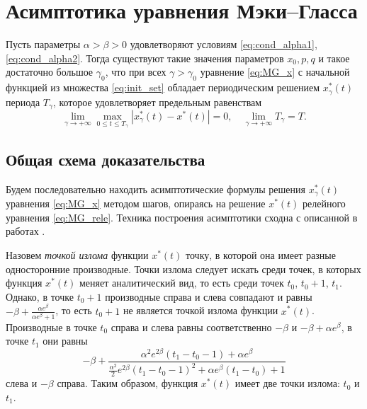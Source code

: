 \section{Асимптотика уравнения Мэки--Гласса}


\begin{theorem}
    \label{thm:existence}
Пусть параметры $\alpha > \beta > 0$ удовлетворяют условиям \eqref{eq:cond_alpha1}, \eqref{eq:cond_alpha2}. Тогда существуют такие значения параметров $x_0, p, q$ и такое достаточно большое $\gamma_0$, что при всех $\gamma > \gamma_0$ уравнение \eqref{eq:MG_x} с начальной функцией из множества \eqref{eq:init_set} обладает периодическим решением $x^*_\gamma(t)$ периода $T_\gamma$, которое удовлетворяет предельным равенствам 
\begin{equation}
\label{eq:lim_x*}
	\lim_{\gamma\to+\infty}\max_{0\leqslant t\leqslant T_\gamma}|x_{\gamma}^*(t)-x^*(t)|=0,\quad \lim_{\gamma\to+\infty}T_{\gamma} = T.
\end{equation}
\end{theorem}

\subsection{Общая схема доказательства}
Будем последовательно находить асимптотические формулы решения $x_{\gamma}^*(t)$ уравнения \eqref{eq:MG_x} методом шагов, опираясь на решение $x^*(t)$ релейного уравнения \eqref{eq:MG_rele}. Техника построения асимптотики сходна с описанной в работах \cite{Kolesov2010, Glyzin2013}.

Назовем \textit{точкой излома} функции $x^*(t)$ точку, в которой она имеет разные односторонние производные. Точки излома следует искать среди точек, в которых функция $x^*(t)$ меняет аналитический вид, то есть среди точек $t_0$, $t_0+1$, $t_1$. Однако, в точке $t_0+1$ производные справа и слева совпадают и равны $-\beta+\frac{\alpha e^{\beta}}{\alpha e^{\beta}+1}$, то есть $t_0+1$ не является точкой излома функции $x^*(t)$. Производные в точке $t_0$ справа и слева равны соответственно $-\beta$ и $-\beta+\alpha e^\beta$, в точке $t_1$ они равны $$-\beta+\frac{\alpha^2e^{2\beta}(t_1-t_0-1)+\alpha e^\beta}{\frac{\alpha^2}{2}e^{2\beta}(t_1-t_0-1)^2+\alpha e^{\beta}(t_1-t_0)+1}$$ слева и $-\beta$ справа. 
Таким образом, функция $x^*(t)$ имеет две точки излома: $t_0$ и $t_1$.

